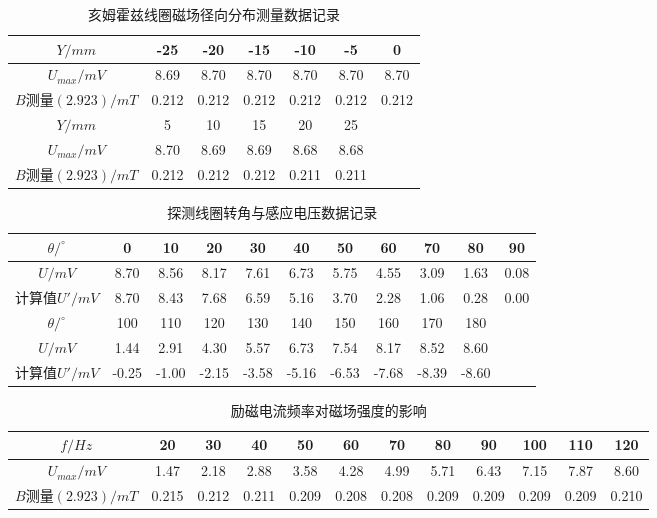 \documentclass[11pt]{article}
\begin{document}
\begin{table}[H]
    \centering
    \caption{亥姆霍兹线圈磁场径向分布测量数据记录}
    \begin{tabular}{|c|c|c|c|c|c|c|}
    \hline
        $Y/mm$ & -25 & -20 & -15 & -10 & -5 & 0 \\ \hline
        $U_{max}/mV$ & 8.69  & 8.70  & 8.70  & 8.70  & 8.70  & 8.70  \\ \hline
        $B\text{测量}(2.923)/mT$ & 0.212  & 0.212  & 0.212  & 0.212  & 0.212  & 0.212 \\\hline
        $Y/mm$ & 5 & 10 & 15 & 20 & 25 & ~ \\ \hline
        $U_{max}/mV$ & 8.70  & 8.69  & 8.69  & 8.68  & 8.68  & ~ \\ \hline
        $B\text{测量}(2.923)/mT$ & 0.212  & 0.212  & 0.212  & 0.211  & 0.211  &  \\\hline
    \end{tabular}
    \label{tab:8}
\end{table}
\begin{table}[H]
    \centering
    \caption{探测线圈转角与感应电压数据记录}
    \begin{tabular}{|c|c|c|c|c|c|c|c|c|c|c|}
    \hline
        $\theta/^\circ$ & 0 & 10 & 20 & 30 & 40 & 50 & 60 & 70 & 80 & 90 \\ \hline
        $U/mV$ & 8.70  & 8.56  & 8.17  & 7.61  & 6.73  & 5.75  & 4.55  & 3.09  & 1.63  & 0.08  \\ \hline
        计算值$U'/mV$ & 8.70  & 8.43  & 7.68  & 6.59  & 5.16  & 3.70  & 2.28  & 1.06  & 0.28  & 0.00  \\ \hline
        $\theta/^\circ$ & 100 & 110 & 120 & 130 & 140 & 150 & 160 & 170 & 180 & ~ \\ \hline
        $U/mV$ & 1.44  & 2.91  & 4.30  & 5.57  & 6.73  & 7.54  & 8.17  & 8.52  & 8.60  & ~ \\ \hline
        计算值$U'/mV$ & -0.25  & -1.00  & -2.15  & -3.58  & -5.16  & -6.53  & -7.68  & -8.39  & -8.60 &\\ \hline
    \end{tabular}
    \label{tab:9}
\end{table}
\begin{table}[H]
    \centering
    \caption{励磁电流频率对磁场强度的影响}
    \begin{tabular}{|c|c|c|c|c|c|c|c|c|c|c|c|}
    \hline
        $f/Hz$ & 20 & 30 & 40 & 50 & 60 & 70 & 80 & 90 & 100 & 110 & 120 \\ \hline
        $U_{max}/mV$ & 1.47  & 2.18  & 2.88  & 3.58  & 4.28  & 4.99  & 5.71  & 6.43  & 7.15  & 7.87  & 8.60  \\ \hline
        $B\text{测量}(2.923)/mT$ &0.215  & 0.212  & 0.211  & 0.209  & 0.208  & 0.208  & 0.209  & 0.209  & 0.209  & 0.209  & 0.210  \\\hline
    \end{tabular}
    \label{tab:10}
\end{table}
\end{document}
